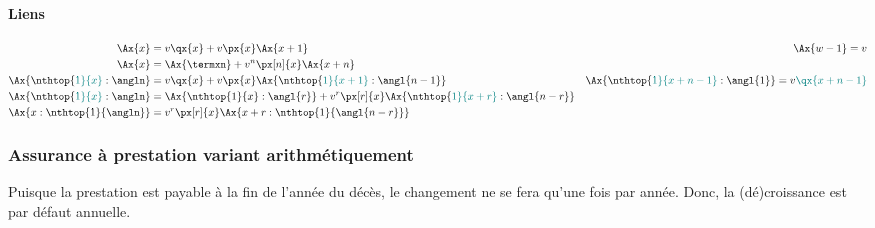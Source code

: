 \documentclass[10pt, french]{article}
\begin{document}
\begin{multicols*}{3}
\paragraph{Liens}

\begin{align*}
	\Ax{x} &= v \qx{x} + v \px{x} \Ax{x + 1} & \Ax{w - 1} = v \\
	\Ax{x} &= \Ax{\termxn} + v^n \px[n]{x} \Ax{x+n} \\
	\Ax{\nthtop{\color{teal}1}{x}:\angln} &= v \qx{x} + v \px{x} \Ax{\nthtop{\color{teal}1}{x + 1}:\angl{n-1}} & \Ax{\nthtop{\color{teal}1}{x + n - 1}:\angl{1}} = v {\color{teal}\qx{x + n - 1}} \\
	\Ax{\nthtop{\color{teal}1}{x}:\angln} &= \Ax{\nthtop{1}{x}:\angl{r}} + v^r \px[r]{x} \Ax{\nthtop{\color{teal}1}{x + r}:\angl{n - r}} \\
	\Ax{x:\nthtop{1}{\angln}} &= v^r \px[r]{x} \Ax{{x + r}:\nthtop{1}{\angl{n - r}}}
\end{align*}

\subsubsection*{\textcolor{amber(sae/ece)}{Assurance à prestation variant arithmétiquement}}

Puisque la prestation est payable à la fin de l'année du décès, le changement ne se fera qu'une fois par année.
Donc, la (dé)croissance est par défaut annuelle.



\end{multicols*}
\end{document}
